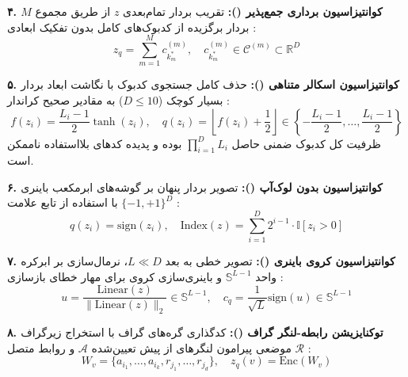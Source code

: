 \textbf{۴. کوانتیزاسیون برداری جمع‌پذیر ():}
تقریب بردار تمام‌بعدی $z$ از طریق مجموع $M$ بردار برگزیده از کدبوک‌های کامل بدون تفکیک ابعادی \cite{babenko2014additive}:
\begin{equation}
    z_q = \sum_{m=1}^M c_{k_m^*}^{(m)}, \quad c_{k_m^*}^{(m)} \in \mathcal{C}^{(m)} \subset \mathbb{R}^D
\end{equation}

\textbf{۵. کوانتیزاسیون اسکالر متناهی ():}
حذف کامل جستجوی کدبوک با نگاشت ابعاد بردار بسیار کوچک ($D \le 10$) به مقادیر صحیح کراندار \cite{mentzer2023finite}:
\begin{equation}
    f(z_i) = \frac{L_i - 1}{2} \tanh(z_i), \quad q(z_i) = \left\lfloor f(z_i) + \frac{1}{2} \right\rfloor \in \left\{ -\frac{L_i-1}{2}, \dots, \frac{L_i-1}{2} \right\}
\end{equation}
ظرفیت کل کدبوک ضمنی حاصل $\prod_{i=1}^D L_i$ بوده و پدیده کدهای بلااستفاده ناممکن است.

\textbf{۶. کوانتیزاسیون بدون لوک‌آپ ():}
تصویر بردار پنهان بر گوشه‌های ابرمکعب باینری $\{-1, +1\}^D$ با استفاده از تابع علامت \cite{yu2024language}:
\begin{equation}
    q(z_i) = \text{sign}(z_i), \quad \text{Index}(z) = \sum_{i=1}^D 2^{i-1} \cdot \mathbb{I}[z_i > 0]
\end{equation}

\textbf{۷. کوانتیزاسیون کروی باینری ():}
تصویر خطی به بعد $L \ll D$، نرمال‌سازی بر ابرکره واحد $\mathbb{S}^{L-1}$ و باینری‌سازی کروی برای مهار خطای بازسازی \cite{zhao2024image}:
\begin{equation}
    u = \frac{\mathrm{Linear}(z)}{\|\mathrm{Linear}(z)\|_2} \in \mathbb{S}^{L-1}, \quad c_q = \frac{1}{\sqrt{L}} \text{sign}(u) \in \mathbb{S}^{L-1}
\end{equation}

\textbf{۸. توکنایزیشن رابطه-لنگر گراف ():}
کدگذاری گره‌های گراف با استخراج زیرگراف موضعی پیرامون لنگرهای از پیش تعیین‌شده $\mathcal{A}$ و روابط متصل $\mathcal{R}$ \cite{galkin2021nodepiece, li2025discrete}:
\begin{equation}
    W_v = \{a_{i_1}, \dots, a_{i_k}, r_{j_1}, \dots, r_{j_d}\}, \quad z_q(v) = \mathrm{Enc}(W_v)
\end{equation}

